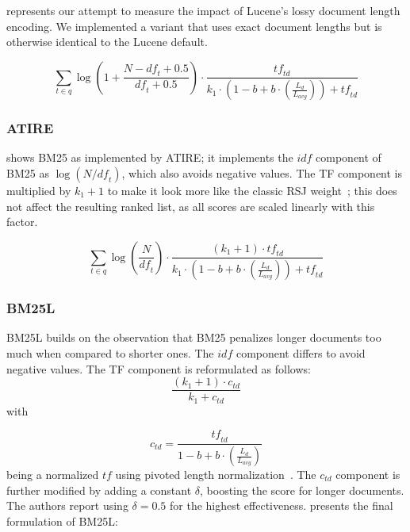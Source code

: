  represents our attempt to measure the impact of Lucene’s lossy document length encoding. We implemented a variant that uses exact document lengths but is otherwise identical to the Lucene default.

\begin{equation}
	\label{lucene-accurate}
	\sum_{t\in q}\log\left(1 + \frac{N-\mathit{df}_t+0.5}{\mathit{df}_t+0.5}\right)\cdot\frac{\mathit{tf}_{\mathit{td}}}{k_1\cdot \left(1-b+b\cdot\left(\frac{L_d}{L_{\mathit{avg}}}\right)\right)+\mathit{tf}_{\mathit{td}}}
\end{equation}

\subsubsection{ATIRE~\citep{ATIRE}}
 shows BM25 as implemented by ATIRE; it implements the $\mathit{idf}$ component of BM25 as $\log(N/\mathit{df}_{t})$, which also avoids negative values. The TF component is multiplied by $k_1+1$ to make it look more like the classic RSJ weight~\citep{RSJ}; this does not affect the resulting ranked list, as all scores are scaled linearly with this factor.

\begin{equation}
	\label{atire-variant}
	\sum_{t\in q}\log\left(\frac{N}{\mathit{df}_t}\right)\cdot\frac{\left(k_1 + 1\right)\cdot \mathit{tf}_{\mathit{td}}}{k_1\cdot\left(1-b+b\cdot\left(\frac{L_{d}}{L_{\mathit{avg}}}\right)\right)+\mathit{tf}_{\mathit{td}}}
\end{equation}

\subsubsection{BM25L~\citep{bm25l}}
BM25L builds on the observation that BM25 penalizes longer documents too much when compared to shorter ones. The $\mathit{idf}$ component differs to avoid negative values. The TF component is reformulated as follows:
\begin{equation}
	\frac{\left(k_1+1\right)\cdot c_{\mathit{td}}}{k_1+c_{\mathit{td}}}  
\end{equation}
with 

\begin{equation}
	c_{\mathit{td}} = \frac{\mathit{tf}_{\mathit{td}}}{1 - b + b \cdot \left(\frac{L_d}{L_{\mathit{avg}}}\right)}  
\end{equation}
being a normalized $tf$ using pivoted length normalization~\citep{ctd}.
The $c_{td}$ component is further modified by adding a constant $\delta$, boosting the score for longer documents. The authors report using $\delta = 0.5$ for the highest effectiveness.  presents the final formulation of BM25L:

